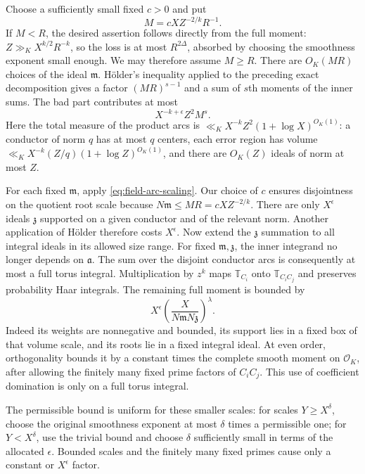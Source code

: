 \documentclass[11pt,reqno]{amsart}
\numberwithin{equation}{section}
\theoremstyle{definition}
\begin{document}
Choose a sufficiently small fixed $c>0$ and put
\[
                  M=cX Z^{-2/k}R^{-1}.
\]
If $M<R$, the desired assertion follows directly from the full moment:
$Z\gg_K X^{k/2}R^{-k}$, so the loss is at most $R^{2\Delta}$,
absorbed by choosing the smoothness exponent small enough.
We may therefore assume $M\ge R$.
There are $O_K(MR)$ choices of the ideal $\mathfrak m$.
H\"older's inequality applied to the preceding exact decomposition gives
a factor $(MR)^{s-1}$ and a sum of $s$th moments of the inner sums.
The bad part contributes at most
\begin{equation}\label{eq:restricted-bad}
                       X^{-k+\epsilon}Z^2M^s.
\end{equation}
Here the total measure of the product arcs is
$\ll_KX^{-k}Z^2(1+\log X)^{O_K(1)}$: a conductor of norm $q$ has at
most $q$ centers, each error region has volume
$\ll_K X^{-k}(Z/q)(1+\log Z)^{O_K(1)}$, and there are $O_K(Z)$ ideals
of norm at most $Z$.

For each fixed $\mathfrak m$, apply \eqref{eq:field-arc-scaling}.
Our choice of $c$ ensures disjointness on the quotient root scale because
$N\mathfrak m\le MR=cXZ^{-2/k}$.
There are only $X^\epsilon$ ideals $\mathfrak z$ supported on a given
conductor and of the relevant norm.  Another application of H\"older
therefore costs $X^\epsilon$.
Now extend the $\mathfrak z$ summation to all integral ideals in its
allowed size range.  For fixed $\mathfrak m,\mathfrak z$, the inner
integrand no longer depends on $\mathfrak a$.  The sum over the disjoint
conductor arcs is consequently at most a full torus integral.
Multiplication by $z^k$ maps $\mathbb T_{C_i}$ onto
$\mathbb T_{C_iC_j}$ and preserves probability Haar integrals.
The remaining full moment is bounded by
\[
 X^\epsilon\left(\frac{X}{N\mathfrak m N\mathfrak z}\right)^\lambda.
\]
Indeed its weights are nonnegative and bounded, its support lies in a
fixed box of that volume scale, and its roots lie in a fixed integral
ideal.  At even order, orthogonality bounds it by a constant times the
complete smooth moment on $\mathcal O_K$, after allowing the finitely
many fixed prime factors of $C_iC_j$.
This use of coefficient domination is only on a full torus integral.

The permissible bound is uniform for these smaller scales: for scales
$Y\ge X^\delta$, choose the original smoothness exponent at most
$\delta$ times a permissible one; for $Y<X^\delta$, use the trivial
bound and choose $\delta$ sufficiently small in terms of the allocated
$\epsilon$.  Bounded scales and the finitely many fixed primes cause
only a constant or $X^\epsilon$ factor.
\end{document}
